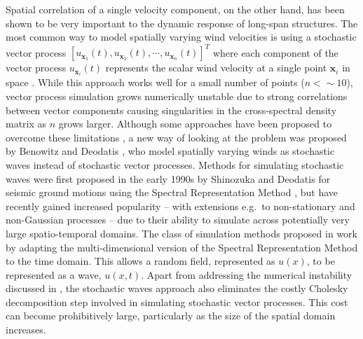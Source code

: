 \documentclass[preprint, review, 12pt]{elsarticle}
\begin{document}
Spatial correlation of a single velocity component, on the other hand, has been shown to be very important to the dynamic response of long-span structures.  The most common way to model spatially varying wind velocities is using a stochastic vector process \cite{deodatis1996simulation} $[u_{\mathbf{x}_1}(t), u_{\mathbf{x}_2}(t), \cdots, u_{\mathbf{x}_n}(t)]^{T}$ where each component of the vector process $u_{\mathbf{x}_i}(t)$ represents the scalar wind velocity at a single point ${\mathbf{x}_i}$ in space \cite{di2001digital}. While this approach works well for a small number of points ($n<  \sim10$), vector process simulation grows numerically unstable due to strong correlations between vector components causing singularities in the cross-spectral density matrix as $n$ grows larger. Although some approaches have been proposed to overcome these limitations \cite{ding2011efficient,gao2012improved,zhao2021simulation,li2022simulation}, a new way of looking at the problem was  proposed by Benowitz and Deodatis \citep{Benowitz2015}, who model spatially varying winds as stochastic waves instead of stochastic vector processes.  Methods for simulating stochastic waves were first proposed in the early 1990s by Shinozuka and Deodatis for seismic ground motions using the Spectral Representation Method \cite{shinozuka1991stochastic}, but have recently gained increased popularity -- with extensions e.g.\ to non-stationary \cite{peng2017simulation} and non-Gaussian \cite{Zhou2020} processes -- due to their ability to simulate across potentially very large spatio-temporal domains. The class of simulation methods proposed in \cite{shinozuka1991stochastic, Benowitz2015, peng2017simulation, Zhou2020} work by adapting the multi-dimensional version of the Spectral Representation Method to the time domain. This allows a random field, represented as $u(x)$, to be represented as a wave, $u(x, t)$. Apart from addressing the numerical instability discussed in \cite{ding2011efficient,gao2012improved,zhao2021simulation,li2022simulation}, the stochastic waves approach also eliminates the costly Cholesky decomposition step involved in simulating stochastic vector processes. This cost can become prohibitively large, particularly as the size of the spatial domain increases.

\end{document}

